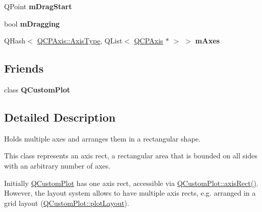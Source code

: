 \begin{DoxyCompactItemize}
\item 
\hypertarget{classQCPAxisRect_a032896b28f83a58010d8d533b78c49df}{\-Q\-Point {\bfseries m\-Drag\-Start}}\label{classQCPAxisRect_a032896b28f83a58010d8d533b78c49df}

\item 
\hypertarget{classQCPAxisRect_ab49a6698194cf0e9e38a1d734c0888a8}{bool {\bfseries m\-Dragging}}\label{classQCPAxisRect_ab49a6698194cf0e9e38a1d734c0888a8}

\item 
\hypertarget{classQCPAxisRect_afe7a24d2a2bea98fc552fa826350ba81}{\-Q\-Hash$<$ \hyperlink{classQCPAxis_ae2bcc1728b382f10f064612b368bc18a}{\-Q\-C\-P\-Axis\-::\-Axis\-Type}, \*
\-Q\-List$<$ \hyperlink{classQCPAxis}{\-Q\-C\-P\-Axis} $\ast$ $>$ $>$ {\bfseries m\-Axes}}\label{classQCPAxisRect_afe7a24d2a2bea98fc552fa826350ba81}

\end{DoxyCompactItemize}
\subsection*{\-Friends}
\begin{DoxyCompactItemize}
\item 
\hypertarget{classQCPAxisRect_a1cdf9df76adcfae45261690aa0ca2198}{class {\bfseries \-Q\-Custom\-Plot}}\label{classQCPAxisRect_a1cdf9df76adcfae45261690aa0ca2198}

\end{DoxyCompactItemize}


\subsection{\-Detailed \-Description}
\-Holds multiple axes and arranges them in a rectangular shape. 

\-This class represents an axis rect, a rectangular area that is bounded on all sides with an arbitrary number of axes.

\-Initially \hyperlink{classQCustomPlot}{\-Q\-Custom\-Plot} has one axis rect, accessible via \hyperlink{classQCustomPlot_a4a37a1add5fe63060ac518cf0a4c4050}{\-Q\-Custom\-Plot\-::axis\-Rect()}. \-However, the layout system allows to have multiple axis rects, e.\-g. arranged in a grid layout (\hyperlink{classQCustomPlot_afd280d4d621ae64a106543a545c508d7}{\-Q\-Custom\-Plot\-::plot\-Layout}).

